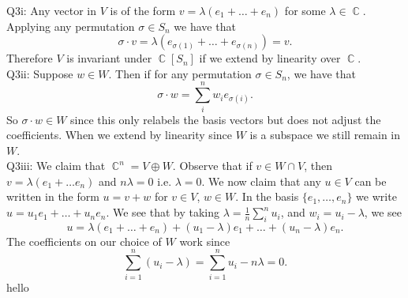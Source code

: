 \documentclass[letterpaper]{article}
\DeclareMathOperator{\C}{\mathbb{C}}
\begin{document}
 \noindent Q3i: 
Any vector in $V$ is of the form $v = \lambda(e_1 + \dots + e_n)$ for some $\lambda \in \C$. Applying any permutation $\sigma \in S_n$ we have that
$$\sigma \cdot v = \lambda (e_{\sigma(1)} + \dots + e_{\sigma(n)}) = v.$$
Therefore $V$ is invariant under $\C[S_n]$ if we extend by linearity over $\C$. 
\newline \\ Q3ii: Suppose $w\in W$. Then if for any permutation $\sigma \in S_n$, we have that $$\sigma \cdot w = \sum_{i}^n w_i e_{\sigma(i)}.$$
So $\sigma \cdot w \in W$ since this only relabels the basis vectors but does not adjust the coefficients. When we extend by linearity since $W$ is a subspace we still remain in $W$. 
\newline \\ Q3iii: We claim that $\C^n = V \oplus W$. Observe that if $v\in W \cap V$, then $v =\lambda(e_1 + \dots e_n)  $ and $n\lambda =0$ i.e. $\lambda =0$.
We now claim that any $u\in V$ can be written in the form $u =v+w $ for $v\in V$, $w\in W$. In the basis $\{e_1, \dots , e_n\}$ we write $u = u_1 e_1 + \dots + u_n e_n$. We see that by taking $\lambda = \frac{1}{n} \sum_{i}^n u_i$, and $w_i = u_i - \lambda$, we see $$u= \lambda (e_1 + \dots + e_n) + (u_1 - \lambda)e_1 + \dots + (u_n - \lambda) e_n .$$ 
The coefficients on our choice of $W$ work since $$\sum_{i=1}^n (u_i - \lambda ) = \sum_{i=1}^n u_i - n\lambda = 0. $$
hello
\end{document}
